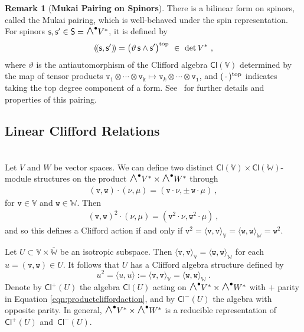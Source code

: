 \documentclass[a4paper, reqno, 11pt]{amsart}
\numberwithin{equation}{section}
\theoremstyle{definition}
\newtheorem{remark}[equation]{Remark}
\newcommand{\ip}[1]{\langle #1 \rangle}
\newcommand{\IV}{\mathbb{V}}
\newcommand{\IW}{\mathbb{W}}
\newcommand{\Cl}{\mathsf{Cl}}
\newcommand{\sfS}{{\mathsf{S}}}
\newcommand{\sfs}{{\mathsf{s}}}
\newcommand{\midwedge}{\text {\Large$\wedge$}}
\theoremstyle{remark}
\begin{document}
\begin{remark}[\textbf{Mukai Pairing on Spinors}]
\label{rem:Mukai}
    There is a bilinear form on spinors, called the Mukai pairing, which is well-behaved under the spin representation. For spinors $\sfs,\sfs'\in\sfS=\midwedge^\bullet V^*$, it is defined by
    \begin{align}
        (\!(\sfs,\sfs')\!) = \big(\vartheta\,\sfs\wedge \sfs'\big)^{\rm top} \ \in \ \det V^* \ ,
    \end{align}
    where $\vartheta$ is the antiautomorphism of the Clifford algebra $\Cl(\IV)$ determined by the map of tensor products $\mathtt{v}_1\otimes\cdots\otimes\mathtt{v_k}\mapsto \mathtt{v}_k\otimes\cdots\otimes\mathtt{v_1}$, and $(\,\cdot\,)^{\rm top}$ indicates taking the top degree component of a form. See~\cite[Section~2.4]{gualtieri:tesi} for further details and properties of this pairing.
\end{remark}

\medskip

\subsection{Linear Clifford Relations}\label{ssec:linearspinorrel}~\\[5pt]
Let $V$ and $W$ be  vector spaces. We can define two distinct $\Cl(\IV)\times \Cl(\IW)$-module structures on the product $\midwedge^\bullet V^* \times \midwedge^\bullet W^*$ through
\begin{align}\label{eqn:productcliffordaction}
    (\texttt{v} , \texttt{w})\cdot(\nu ,\mu) = (\texttt{v}\cdot \nu ,\pm\, \texttt{w}\cdot \mu) \ ,
\end{align}
for $\texttt{v} \in \IV$ and $\texttt{w}\in \IW$. Then
\begin{align}
    (\texttt{v} , \texttt{w})^2\cdot(\nu ,\mu) = (\texttt{v}^2\cdot \nu , \texttt{w}^2\cdot \mu) \ ,
\end{align}
and so this defines a Clifford action if and only if $\texttt{v}^2=\ip{\texttt{v},\texttt{v}}_\IV = \ip{\texttt{w},\texttt{w}}_\IW = \texttt{w}^2$. 

Let $U \subset \IV \times \overline{\IW}$ be an isotropic subspace. Then $\ip{\texttt{v},\texttt{v}}_\IV = \ip{\texttt{w},\texttt{w}}_{\IW}$ for each $u = (\texttt{v}, \texttt{w}) \in U$. It follows that $U$ has a Clifford algebra structure defined by $$u^2 = \ip{u,u}:=\ip{\texttt{v},\texttt{v}}_\IV = \ip{\texttt{w},\texttt{w}}_\IW \ . $$ Denote by $\Cl^+(U)$ the algebra $\Cl(U)$ acting on $\midwedge^\bullet V^* \times \midwedge^\bullet W^*$ with $+$ parity in Equation \eqref{eqn:productcliffordaction}, and by $\Cl^-(U)$ the algebra with opposite parity. In general, $\midwedge^\bullet V^* \times \midwedge^\bullet W^*$ is a reducible representation of $\Cl^+(U)$ and~$\Cl^-(U)$.
\end{document}
